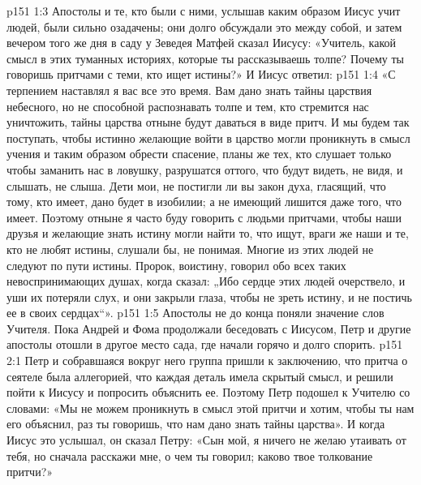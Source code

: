 \vs p151 1:3 \pc Апостолы и те, кто были с ними, услышав каким образом Иисус учит людей, были сильно озадачены; они долго обсуждали это между собой, и затем вечером того же дня в саду у Зеведея Матфей сказал Иисусу: «Учитель, какой смысл в этих туманных историях, которые ты рассказываешь толпе? Почему ты говоришь притчами с теми, кто ищет истины?» И Иисус ответил:
\vs p151 1:4 «С терпением наставлял я вас все это время. Вам дано знать тайны царствия небесного, но не способной распознавать толпе и тем, кто стремится нас уничтожить, тайны царства отныне будут даваться в виде притч. И мы будем так поступать, чтобы истинно желающие войти в царство могли проникнуть в смысл учения и таким образом обрести спасение, планы же тех, кто слушает только чтобы заманить нас в ловушку, разрушатся оттого, что будут видеть, не видя, и слышать, не слыша. Дети мои, не постигли ли вы закон духа, гласящий, что тому, кто имеет, дано будет в изобилии; а не имеющий лишится даже того, что имеет. Поэтому отныне я часто буду говорить с людьми притчами, чтобы наши друзья и желающие знать истину могли найти то, что ищут, враги же наши и те, кто не любят истины, слушали бы, не понимая. Многие из этих людей не следуют по пути истины. Пророк, воистину, говорил обо всех таких невоспринимающих душах, когда сказал: „Ибо сердце этих людей очерствело, и уши их потеряли слух, и они закрыли глаза, чтобы не зреть истину, и не постичь ее в своих сердцах“».
\vs p151 1:5 Апостолы не до конца поняли значение слов Учителя. Пока Андрей и Фома продолжали беседовать с Иисусом, Петр и другие апостолы отошли в другое место сада, где начали горячо и долго спорить.
\vs p151 2:1 Петр и собравшаяся вокруг него группа пришли к заключению, что притча о сеятеле была аллегорией, что каждая деталь имела скрытый смысл, и решили пойти к Иисусу и попросить объяснить ее. Поэтому Петр подошел к Учителю со словами: «Мы не можем проникнуть в смысл этой притчи и хотим, чтобы ты нам его объяснил, раз ты говоришь, что нам дано знать тайны царства». И когда Иисус это услышал, он сказал Петру: «Сын мой, я ничего не желаю утаивать от тебя, но сначала расскажи мне, о чем ты говорил; каково твое толкование притчи?»
